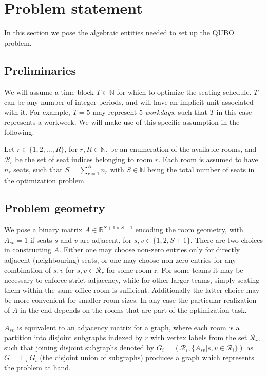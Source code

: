 \documentclass[10pt]{article}
\theoremstyle{definition}
\theoremstyle{plain}
\theoremstyle{remark}
\begin{document}
	\section{Problem statement}
	In this section we pose the algebraic entities needed to set up the QUBO problem. 
	
	\subsection{Preliminaries}
	We will assume a time block $T\in\mathbb{N}$ for which to optimize the seating schedule. $T$ can be any number of integer periods, and will have an implicit unit associated with it. For example, $T=5$ may represent $5$ \emph{workdays}, such that $T$ in this case represents a workweek. We will make use of this specific assumption in the following. 
	
	Let $r\in\{1,2,\dots,R\}$, for $r,R\in\mathbb{N}$, be an enumeration of the available rooms, and $\mathcal{R}_r$ be the set of seat indices belonging to room $r$. Each room is assumed to have $n_r$ seats, such that $S = \sum_{r=1}^{R} n_r$ with $S\in\mathbb{N}$ being the total number of seats in the optimization problem. 
	
	\subsection{Problem geometry}
	
	We pose a binary matrix $A\in\mathbb{B}^{S+1 \times S+1}$ encoding the room geometry, with $A_{sv}=1$ if seats $s$ and $v$ are adjacent, for $s,v\in\{1,2,S+1\}$. There are two choices in constructing $A$. Either one may choose non-zero entries only for directly adjacent (neighbouring) seats, or one may choose non-zero entries for any combination of $s,v$ for $s,v\in \mathcal{R}_r$ for some room r. For some teams it may be necessary to enforce strict adjacency, while for other larger teams, simply seating them within the same office room is sufficient. Additionally the latter choice may be more convenient for smaller room sizes. In any case the particular realization of $A$ in the end depends on the rooms that are part of the optimization task. 
	
	$A_{sv}$ is equivalent to an adjacency matrix for a graph, where each room is a partition into disjoint subgraphs indexed by $r$ with vertex labels from the set $\mathcal{R}_r$, such that joining disjoint subgraphs denoted by $G_i = \left(\mathcal{R}_i, \{A_{sv}|s,v\in \mathcal{R}_i\}\right)$ as $G = \sqcup_i G_i$ (the disjoint union of subgraphs) produces a graph which represents the problem at hand.
		
\end{document}
